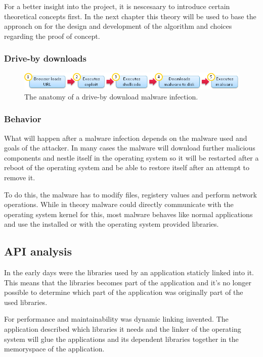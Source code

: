 For a better insight into the project, it is nescesaary to introduce certain theoretical concepts first. In the next chapter this theory will be used to base the approach on for the design and development of the algorithm and choices regarding the proof of concept.

\subsubsection{Drive-by downloads}

\begin{figure}
    \centering
    \includegraphics[width=12cm]{Images/drive-by-download.png}
    \caption{The anatomy of a drive-by download malware infection. \cite{http://blog.armorize.com/2011/04/newest-adobe-flash-0-day-used-in-new.html (modified)}}
    \label{fig:dbdownload}
\end{figure}

\subsubsection{Behavior}

What will happen after a malware infection depends on the malware used and goals of the attacker. In many cases the malware will download further malicious components and nestle itself in the operating system so it will be restarted after a reboot of the operating system and be able to restore itself after an attempt to remove it.

To do this, the malware has to modify files, registery values and perform network operations. While in theory malware could directly communicate with the operating system kernel for this, most malware behaves like normal applications and use the installed or with the operating system provided libraries.

\subsection{API analysis}

In the early days were the libraries used by an application staticly linked into it. This means that the libraries becomes part of the application and it's no longer possible to determine which part of the application was originally part of the used libraries.

For performance and maintainability was dynamic linking invented. The application described which libraries it needs and the linker of the operating system will glue the applications and its dependent libraries together in the memoryspace of the application. 

